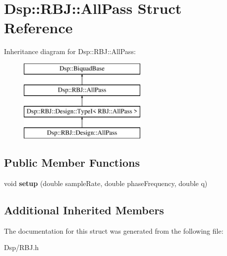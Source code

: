 \hypertarget{structDsp_1_1RBJ_1_1AllPass}{\section{Dsp\-:\-:R\-B\-J\-:\-:All\-Pass Struct Reference}
\label{structDsp_1_1RBJ_1_1AllPass}
}
Inheritance diagram for Dsp\-:\-:R\-B\-J\-:\-:All\-Pass\-:\begin{figure}[H]
\begin{center}
\leavevmode
\includegraphics[height=4.000000cm]{structDsp_1_1RBJ_1_1AllPass}
\end{center}
\end{figure}
\subsection*{Public Member Functions}
\begin{DoxyCompactItemize}
\item 
\hypertarget{structDsp_1_1RBJ_1_1AllPass_a97167c5ad1097e733bc135d8da7e4a9e}{void {\bfseries setup} (double sample\-Rate, double phase\-Frequency, double q)}\label{structDsp_1_1RBJ_1_1AllPass_a97167c5ad1097e733bc135d8da7e4a9e}

\end{DoxyCompactItemize}
\subsection*{Additional Inherited Members}


The documentation for this struct was generated from the following file\-:\begin{DoxyCompactItemize}
\item 
Dsp/R\-B\-J.\-h\end{DoxyCompactItemize}
